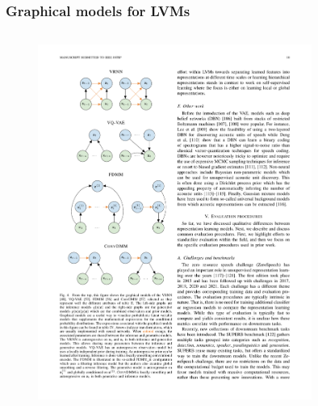 \begin{frame}
    \frametitle{Graphical models for LVMs}
    \begin{columns}

        \begin{column}{0.5\textwidth}
            \begin{figure}
                \centering
                \includegraphics[width=0.8\textwidth]{figures/brief-vrnn-vqvae.pdf}
            \end{figure}
        \end{column}


\end{columns}
\end{frame}
